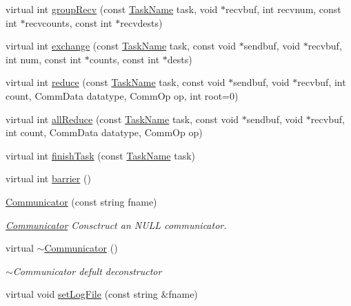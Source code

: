 \begin{DoxyCompactItemize}
\item 
virtual int \hyperlink{classHSF_1_1Communicator_a227d4526e8392d941a5ab1b8ead22ded}{groupRecv} (const \hyperlink{namespaceHSF_a928eb958edfcd09f62de19e9cd3bac70}{TaskName} task, void $\ast$recvbuf, int recvnum, const int $\ast$recvcounts, const int $\ast$recvdests)
\item 
virtual int \hyperlink{classHSF_1_1Communicator_a71edf40d99144d1f73fe62a9ece81b1c}{exchange} (const \hyperlink{namespaceHSF_a928eb958edfcd09f62de19e9cd3bac70}{TaskName} task, const void $\ast$sendbuf, void $\ast$recvbuf, int num, const int $\ast$counts, const int $\ast$dests)
\item 
virtual int \hyperlink{classHSF_1_1Communicator_a0db2a6f37d9658f57fa2a5c7d2e26950}{reduce} (const \hyperlink{namespaceHSF_a928eb958edfcd09f62de19e9cd3bac70}{TaskName} task, const void $\ast$sendbuf, void $\ast$recvbuf, int count, CommData datatype, CommOp op, int root=0)
\item 
virtual int \hyperlink{classHSF_1_1Communicator_a510bb4c1d745693f8dabcbdc9694b782}{allReduce} (const \hyperlink{namespaceHSF_a928eb958edfcd09f62de19e9cd3bac70}{TaskName} task, const void $\ast$sendbuf, void $\ast$recvbuf, int count, CommData datatype, CommOp op)
\item 
virtual int \hyperlink{classHSF_1_1Communicator_a1773f5d7c1f6c6bc83e53a48deba5510}{finishTask} (const \hyperlink{namespaceHSF_a928eb958edfcd09f62de19e9cd3bac70}{TaskName} task)
\item 
virtual int \hyperlink{classHSF_1_1Communicator_a268366a86ccbb00d630b9b660a02b7c2}{barrier} ()
\item 
\hyperlink{classHSF_1_1Communicator_a3d860a8bbf699d64805747144fc4e53b}{Communicator} (const string fname)
\begin{DoxyCompactList}\small\item\em \hyperlink{classHSF_1_1Communicator}{Communicator} Consctruct an NULL communicator. \item\end{DoxyCompactList}\item 
virtual \hyperlink{classHSF_1_1Communicator_a3cd6eb9e85605b89e7763246aac70bb0}{$\sim$Communicator} ()
\begin{DoxyCompactList}\small\item\em $\sim$Communicator defult deconstructor \item\end{DoxyCompactList}\item 
virtual void \hyperlink{classHSF_1_1Communicator_a0c67eacadd200a1f385bf1487561d05d}{setLogFile} (const string \&fname)

\end{DoxyCompactItemize}
